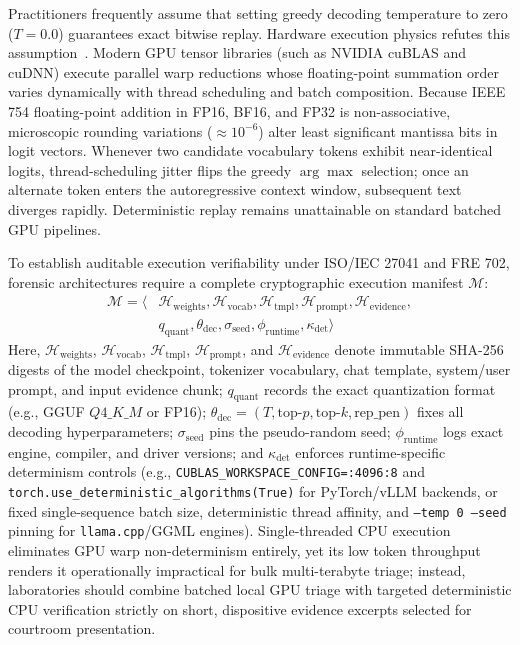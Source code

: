 Practitioners frequently assume that setting greedy decoding temperature to zero ($T=0.0$) guarantees exact bitwise replay. Hardware execution physics refutes this assumption~\cite{michelet2024_chatgpt, trivedi2026_when, scanlon2026_investigation}. Modern GPU tensor libraries (such as NVIDIA cuBLAS and cuDNN) execute parallel warp reductions whose floating-point summation order varies dynamically with thread scheduling and batch composition. Because IEEE 754 floating-point addition in FP16, BF16, and FP32 is non-associative, microscopic rounding variations ($\approx 10^{-6}$) alter least significant mantissa bits in logit vectors. Whenever two candidate vocabulary tokens exhibit near-identical logits, thread-scheduling jitter flips the greedy $\arg\max$ selection; once an alternate token enters the autoregressive context window, subsequent text diverges rapidly. Deterministic replay remains unattainable on standard batched GPU pipelines.

To establish auditable execution verifiability under ISO/IEC 27041 and FRE 702, forensic architectures require a complete cryptographic execution manifest $\mathcal{M}$:
\begin{align}
\label{eq:forensic_manifest}
\mathcal{M} = \langle &\mathcal{H}_{\text{weights}}, \mathcal{H}_{\text{vocab}}, \mathcal{H}_{\text{tmpl}}, \mathcal{H}_{\text{prompt}}, \mathcal{H}_{\text{evidence}}, \nonumber \\
&q_{\text{quant}}, \theta_{\text{dec}}, \sigma_{\text{seed}}, \phi_{\text{runtime}}, \kappa_{\text{det}} \rangle
\end{align}
Here, $\mathcal{H}_{\text{weights}}$, $\mathcal{H}_{\text{vocab}}$, $\mathcal{H}_{\text{tmpl}}$, $\mathcal{H}_{\text{prompt}}$, and $\mathcal{H}_{\text{evidence}}$ denote immutable SHA-256 digests of the model checkpoint, tokenizer vocabulary, chat template, system/user prompt, and input evidence chunk; $q_{\text{quant}}$ records the exact quantization format (e.g., GGUF $Q4\_K\_M$ or FP16); $\theta_{\text{dec}} = (T, \text{top-}p, \text{top-}k, \text{rep\_pen})$ fixes all decoding hyperparameters; $\sigma_{\text{seed}}$ pins the pseudo-random seed; $\phi_{\text{runtime}}$ logs exact engine, compiler, and driver versions; and $\kappa_{\text{det}}$ enforces runtime-specific determinism controls (e.g., \texttt{CUBLAS\_WORKSPACE\_CONFIG=:4096:8} and \texttt{torch.use\_deterministic\_algorithms(True)} for PyTorch/vLLM backends, or fixed single-sequence batch size, deterministic thread affinity, and \texttt{--temp 0 --seed} pinning for \texttt{llama.cpp}/GGML engines). Single-threaded CPU execution eliminates GPU warp non-determinism entirely, yet its low token throughput renders it operationally impractical for bulk multi-terabyte triage; instead, laboratories should combine batched local GPU triage with targeted deterministic CPU verification strictly on short, dispositive evidence excerpts selected for courtroom presentation.

